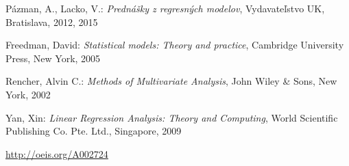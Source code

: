 \begin{thebibliography}{99}

	 Pázman, A., Lacko, V.: {\it Prednášky z regresných modelov}, Vydavateľstvo UK, Bratislava, 2012, 2015

	 Freedman, David: {\it Statistical models: Theory and practice}, Cambridge University Press, New York, 2005

	 Rencher, Alvin C.: {\it Methods of Multivariate Analysis}, John Wiley \& Sons, New York, 2002

	 Yan, Xin: {\it Linear Regression Analysis: Theory and Computing}, World Scientific Publishing Co. Pte. Ltd., Singapore, 2009

	 \url{http://oeis.org/A002724}

\end{thebibliography}
